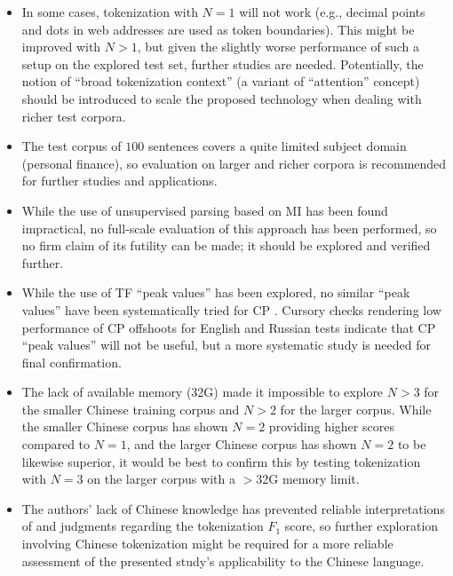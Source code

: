 \documentclass[11pt]{article}
\begin{document}
\begin{itemize} 

\item In some cases, tokenization with $N=1$ will not work (e.g., decimal points and dots in web addresses are used as token boundaries). This might be improved with $N>1$, but given the slightly worse performance of such a setup on the explored test set, further studies are needed. Potentially, the notion of “broad tokenization context” (a variant of  “attention” concept) should be introduced to scale the proposed technology when dealing with richer test corpora.

\item The test corpus of $100$ sentences covers a quite limited subject domain (personal finance), so evaluation on larger and richer corpora is recommended for further studies and applications.

\item While the use of unsupervised parsing based on MI has been found impractical, no full-scale evaluation of this approach has been performed, so no firm claim of its futility can be made; it should be explored and verified further.

\item While the use of TF “peak values” has been explored, no similar “peak values” have been systematically tried for CP \citep{11,12}. Cursory checks rendering low performance of CP offshoots for English and Russian tests indicate that CP “peak values” will not be useful, but a more systematic study is needed for final confirmation.

\item The lack of available memory (32G) made it impossible to explore $N>3$ for the smaller Chinese training corpus and $N>2$ for the larger corpus. While the smaller Chinese corpus has shown $N=2$ providing higher scores compared to $N=1$, and the larger Chinese corpus has shown $N=2$ to be likewise superior, it would be best to confirm this by testing tokenization with $N=3$ on the larger corpus with a $>$32G memory limit.

\item The authors’ lack of Chinese knowledge has prevented reliable interpretations of and judgments regarding the tokenization $F_1$ score, so further exploration involving Chinese tokenization might be required for a more reliable assessment of the presented study’s applicability to the Chinese language.

\end{itemize}
\end{document}
